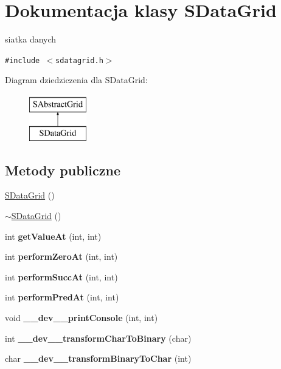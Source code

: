 \hypertarget{classSDataGrid}{
\section{Dokumentacja klasy SDataGrid}
\label{classSDataGrid}
}
siatka danych  


{\tt \#include $<$sdatagrid.h$>$}

Diagram dziedziczenia dla SDataGrid:\begin{figure}[H]
\begin{center}
\leavevmode
\includegraphics[height=2cm]{classSDataGrid}
\end{center}
\end{figure}
\subsection*{Metody publiczne}
\begin{CompactItemize}
\item 
\hyperlink{classSDataGrid_741ea12ba0eec8c00fec30c8730f2192}{SDataGrid} ()
\item 
\hyperlink{classSDataGrid_51645b217b4c668e0e945cdbda1db3ec}{$\sim$SDataGrid} ()
\item 
\hypertarget{classSDataGrid_7f9dd63d74e36731875630a96ea8dd07}{
int \textbf{getValueAt} (int, int)}
\label{classSDataGrid_7f9dd63d74e36731875630a96ea8dd07}

\item 
\hypertarget{classSDataGrid_fb34906c27b14e12fed01747f5763e68}{
int \textbf{performZeroAt} (int, int)}
\label{classSDataGrid_fb34906c27b14e12fed01747f5763e68}

\item 
\hypertarget{classSDataGrid_efb7f5da116641e2be648a6c8ad87643}{
int \textbf{performSuccAt} (int, int)}
\label{classSDataGrid_efb7f5da116641e2be648a6c8ad87643}

\item 
\hypertarget{classSDataGrid_c0b8507ad56abd1cd084e7a0c2218347}{
int \textbf{performPredAt} (int, int)}
\label{classSDataGrid_c0b8507ad56abd1cd084e7a0c2218347}

\item 
\hypertarget{classSDataGrid_8b94af72ddf880b0297baf24ceb2395a}{
void \textbf{\_\-\_\-dev\_\-\_\-printConsole} (int, int)}
\label{classSDataGrid_8b94af72ddf880b0297baf24ceb2395a}

\item 
\hypertarget{classSDataGrid_8421b3a44bfa7f38fd99cd9b5338ecc1}{
int \textbf{\_\-\_\-dev\_\-\_\-transformCharToBinary} (char)}
\label{classSDataGrid_8421b3a44bfa7f38fd99cd9b5338ecc1}

\item 
\hypertarget{classSDataGrid_8b1d40667ed06f454071faeaaa802b66}{
char \textbf{\_\-\_\-dev\_\-\_\-transformBinaryToChar} (int)}
\label{classSDataGrid_8b1d40667ed06f454071faeaaa802b66}

\end{CompactItemize}
